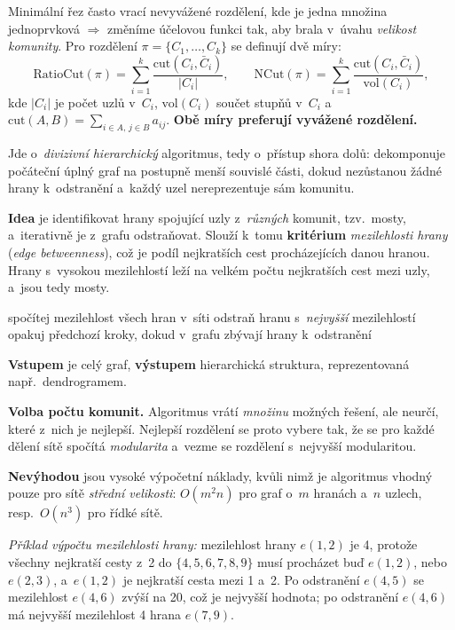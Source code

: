\documentclass[11pt,a4paper]{article}
\theoremstyle{definition}
\begin{document}
\begin{defbox}
Minimální řez často vrací nevyvážené rozdělení, kde je jedna množina jednoprvková $\Rightarrow$
změníme účelovou funkci tak, aby brala v~úvahu \emph{velikost komunity}. Pro rozdělení
$\pi=\{C_1,\dots,C_k\}$ se definují dvě míry:
\[ \mathrm{RatioCut}(\pi)=\sum_{i=1}^{k}\frac{\mathrm{cut}(C_i,\bar C_i)}{|C_i|},\qquad
   \mathrm{NCut}(\pi)=\sum_{i=1}^{k}\frac{\mathrm{cut}(C_i,\bar C_i)}{\mathrm{vol}(C_i)}, \]
kde $|C_i|$ je počet uzlů v~$C_i$, $\mathrm{vol}(C_i)$ součet stupňů v~$C_i$
a~$\mathrm{cut}(A,B)=\sum_{i\in A,\,j\in B}a_{ij}$. \textbf{Obě míry preferují vyvážené
rozdělení.}
\end{defbox}

\begin{defbox}
Jde o~\emph{divizivní hierarchický} algoritmus, tedy o~přístup shora dolů: dekomponuje počáteční
úplný graf na postupně menší souvislé části, dokud nezůstanou žádné hrany k~odstranění a~každý
uzel nereprezentuje sám komunitu.

\textbf{Idea} je identifikovat hrany spojující uzly z~\emph{různých} komunit, tzv.\ mosty,
a~iterativně je z~grafu odstraňovat. Slouží k~tomu \textbf{kritérium} \emph{mezilehlosti hrany}
(\emph{edge betweenness}), což je podíl nejkratších cest procházejících danou hranou. Hrany
s~vysokou mezilehlostí leží na velkém počtu nejkratších cest mezi uzly, a~jsou tedy mosty.

\begin{algorithmic}[1]
\State spočítej mezilehlost všech hran v~síti
\State odstraň hranu s~\emph{nejvyšší} mezilehlostí
\State opakuj předchozí kroky, dokud v~grafu zbývají hrany k~odstranění
\end{algorithmic}
\textbf{Vstupem} je celý graf, \textbf{výstupem} hierarchická struktura, reprezentovaná např.\
dendrogramem.

\textbf{Volba počtu komunit.} Algoritmus vrátí \emph{množinu} možných řešení, ale neurčí, které
z~nich je nejlepší. Nejlepší rozdělení se proto vybere tak, že se pro každé dělení sítě spočítá
\emph{modularita} a~vezme se rozdělení s~nejvyšší modularitou.

\textbf{Nevýhodou} jsou vysoké výpočetní náklady, kvůli nimž je algoritmus vhodný pouze pro sítě
\emph{střední velikosti}: $O(m^2n)$ pro graf o~$m$ hranách a~$n$ uzlech, resp.\ $O(n^3)$ pro
řídké sítě.
\end{defbox}

\emph{Příklad výpočtu mezilehlosti hrany:} mezilehlost hrany $e(1,2)$ je 4, protože všechny
nejkratší cesty z~2 do $\{4,5,6,7,8,9\}$ musí procházet buď $e(1,2)$, nebo $e(2,3)$, a~$e(1,2)$
je nejkratší cesta mezi 1 a~2. Po odstranění $e(4,5)$ se mezilehlost $e(4,6)$ zvýší na 20, což
je nejvyšší hodnota; po odstranění $e(4,6)$ má nejvyšší mezilehlost 4 hrana $e(7,9)$.
\end{document}
